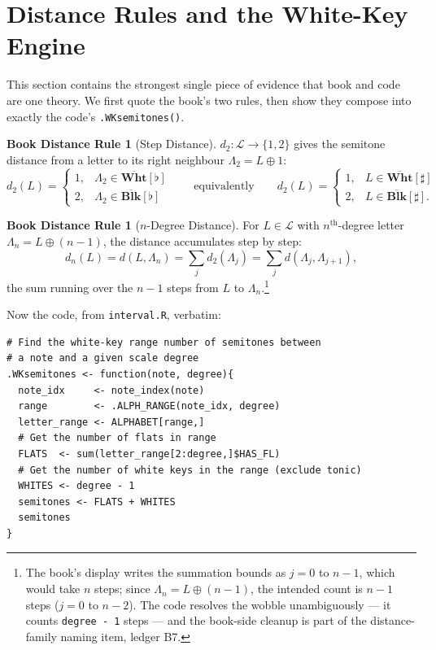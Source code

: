\documentclass[11pt]{article}
\newcommand{\MAlph}{\mathcal{L}}                 %
\newcommand{\Lam}{\Lambda}                      %
\newcommand{\BL}{\overline{\textbf{Blk}}}       %
\newcommand{\WH}{\overline{\textbf{Wht}}}       %
\theoremstyle{definition}
\newtheorem{bookdist}[bookdef]{Book Distance Rule}
\theoremstyle{remark}
\newcommand{\code}[1]{\texttt{#1}}
\newcommand{\file}[1]{\texttt{#1}}
\begin{document}
\section{Distance Rules and the White-Key Engine}\label{sec:distances}

This section contains the strongest single piece of evidence that book and code
are one theory. We first quote the book's two rules, then show they compose into
exactly the code's \code{.WKsemitones()}.

\begin{bookdist}[Step Distance]\label{rule:step}
$d_2 : \MAlph \to \{1, 2\}$ gives the semitone distance from a letter to its
right neighbour $\Lam_2 = L \oplus 1$:
$$d_2(L) =
  \begin{cases}
    1, & \Lam_2 \in \WH[\flat] \\
    2, & \Lam_2 \in \BL[\flat]
  \end{cases}
\qquad\text{equivalently}\qquad
d_2(L) =
  \begin{cases}
    1, & L \in \WH[\sharp] \\
    2, & L \in \BL[\sharp].
  \end{cases}$$
\end{bookdist}

\begin{bookdist}[$n$-Degree Distance]\label{rule:ndeg}
For $L \in \MAlph$ with $n^{\text{th}}$-degree letter $\Lam_n = L \oplus (n-1)$,
the distance accumulates step by step:
$$d_n(L) = d(L, \Lam_n) = \sum_{j} d_2(\Lam_j) = \sum_{j} d(\Lam_j, \Lam_{j+1}),$$
the sum running over the $n - 1$ steps from $L$ to $\Lam_n$.\footnote{The book's
display writes the summation bounds as $j = 0$ to $n-1$, which would take $n$
steps; since $\Lam_n = L \oplus (n-1)$, the intended count is $n-1$ steps
($j = 0$ to $n-2$). The code resolves the wobble unambiguously --- it counts
\code{degree - 1} steps --- and the book-side cleanup is part of the
distance-family naming item, ledger B7.}
\end{bookdist}

Now the code, from \file{interval.R}, verbatim:

\begin{lstlisting}
# Find the white-key range number of semitones between
# a note and a given scale degree
.WKsemitones <- function(note, degree){
  note_idx     <- note_index(note)
  range        <- .ALPH_RANGE(note_idx, degree)
  letter_range <- ALPHABET[range,]
  # Get the number of flats in range
  FLATS  <- sum(letter_range[2:degree,]$HAS_FL)
  # Get the number of white keys in the range (exclude tonic)
  WHITES <- degree - 1
  semitones <- FLATS + WHITES
  semitones
}
\end{lstlisting}
\end{document}
